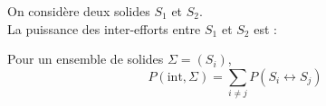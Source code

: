 ﻿\documentclass[a4paper]{article}
\begin{document}
\pagestyle{fancy}
\fancyhf{}
\setlength{\headheight}{15pt}

\begin{center}
	\large{}
\end{center}



On considère deux solides \( S_1 \) et \( S_2 \). \\
La puissance des inter-efforts entre \( S_1 \) et \( S_2 \) est :
\begin{center}
\end{center}

Pour un ensemble de solides \( \Sigma = (S_i) \), \[ P(\mathrm{int}, \Sigma) = \sum_{i\neq j} P(S_i \leftrightarrow S_j) \]
\end{document}
